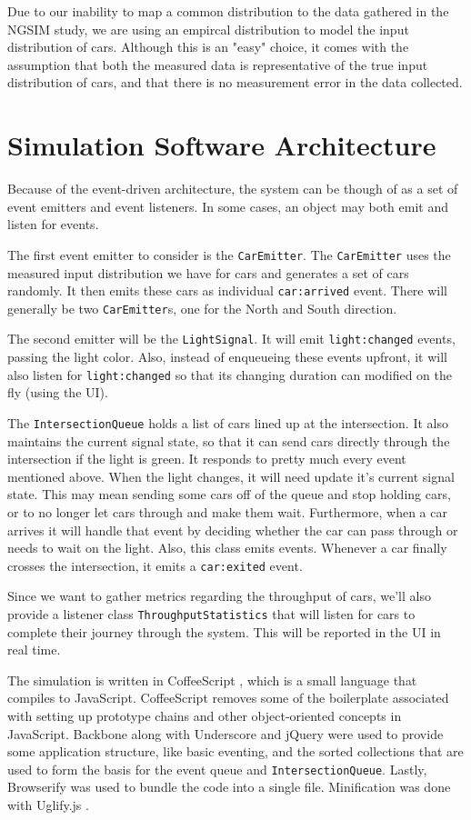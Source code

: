 \documentclass[a4paper,12pt]{article}
\begin{document}
Due to our inability to map a common distribution to the data gathered in the NGSIM study, we are using an empircal
distribution to model the input distribution of cars. Although this is an "easy" choice, it comes with the assumption
that both the measured data is representative of the true input distribution of cars, and that there is no measurement
error in the data collected. 

\section{Simulation Software Architecture}
Because of the event-driven architecture, the system can be though of as a set of event emitters and event listeners.
In some cases, an object may both emit and listen for events.

The first event emitter to consider is the \texttt{CarEmitter}. The \texttt{CarEmitter} uses the measured input
distribution we have for cars and generates a set of cars randomly. It then emits these cars as individual
\texttt{car:arrived} event. There will generally be two \texttt{CarEmitter}s, one for the North and South direction.

The second emitter will be the \texttt{LightSignal}. It will emit \texttt{light:changed} events, passing the light color.
Also, instead of enqueueing these events upfront, it will also listen for \texttt{light:changed} so that its
changing duration can modified on the fly (using the UI).

The \texttt{IntersectionQueue} holds a list of cars lined up at the intersection. It also maintains the
current signal state, so that it can send cars directly through the intersection if the light is green. It responds
to pretty much every event mentioned above. When the light changes, it will need update it's current signal state.
This may mean sending some cars off of the queue and stop holding cars, or to no longer let cars through and make them
wait. Furthermore, when a car arrives it will handle that event by deciding whether the car can pass through or needs
to wait on the light. Also, this class emits events. Whenever a car finally crosses the intersection, it emits
a \texttt{car:exited} event.

Since we want to gather metrics regarding the throughput of cars, we'll also provide a listener class
\texttt{ThroughputStatistics} that will listen for cars to complete their journey through the system. This will
be reported in the UI in real time.

The simulation is written in CoffeeScript \cite{coffeescript}, which is a small language that compiles to JavaScript.
CoffeeScript removes some of the boilerplate associated with setting up prototype chains and other object-oriented
concepts in JavaScript.
Backbone \cite{backbone} along with Underscore \cite{underscore} and jQuery \cite{jquery} were used to provide some
application structure, like basic eventing, and the sorted
collections that are used to form the basis for the event queue and \texttt{IntersectionQueue}. Lastly, Browserify
\cite{browserify} was used to bundle the code into a single file. Minification was done with Uglify.js \cite{uglify}.
\end{document}
